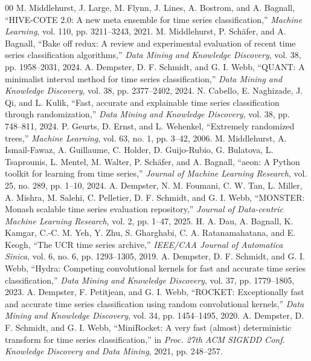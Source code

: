 \documentclass[conference]{IEEEtran}
\begin{document}
\clearpage
\begin{thebibliography}{00}
 M. Middlehurst, J. Large, M. Flynn, J. Lines, A. Bostrom, and A. Bagnall, ``HIVE-COTE 2.0: A new meta ensemble for time series classification,'' \textit{Machine Learning}, vol. 110, pp. 3211--3243, 2021.
 M. Middlehurst, P. Sch\"afer, and A. Bagnall, ``Bake off redux: A review and experimental evaluation of recent time series classification algorithms,'' \textit{Data Mining and Knowledge Discovery}, vol. 38, pp. 1958--2031, 2024.
 A. Dempster, D. F. Schmidt, and G. I. Webb, ``QUANT: A minimalist interval method for time series classification,'' \textit{Data Mining and Knowledge Discovery}, vol. 38, pp. 2377--2402, 2024.
 N. Cabello, E. Naghizade, J. Qi, and L. Kulik, ``Fast, accurate and explainable time series classification through randomization,'' \textit{Data Mining and Knowledge Discovery}, vol. 38, pp. 748--811, 2024.
 P. Geurts, D. Ernst, and L. Wehenkel, ``Extremely randomized trees,'' \textit{Machine Learning}, vol. 63, no. 1, pp. 3--42, 2006.
 M. Middlehurst, A. Ismail-Fawaz, A. Guillaume, C. Holder, D. Guijo-Rubio, G. Bulatova, L. Tsaprounis, L. Mentel, M. Walter, P. Sch\"afer, and A. Bagnall, ``aeon: A Python toolkit for learning from time series,'' \textit{Journal of Machine Learning Research}, vol. 25, no. 289, pp. 1--10, 2024.
 A. Dempster, N. M. Foumani, C. W. Tan, L. Miller, A. Mishra, M. Salehi, C. Pelletier, D. F. Schmidt, and G. I. Webb, ``MONSTER: Monash scalable time series evaluation repository,'' \textit{Journal of Data-centric Machine Learning Research}, vol. 2, pp. 1--47, 2025.
 H. A. Dau, A. Bagnall, K. Kamgar, C.-C. M. Yeh, Y. Zhu, S. Gharghabi, C. A. Ratanamahatana, and E. Keogh, ``The UCR time series archive,'' \textit{IEEE/CAA Journal of Automatica Sinica}, vol. 6, no. 6, pp. 1293--1305, 2019.
 A. Dempster, D. F. Schmidt, and G. I. Webb, ``Hydra: Competing convolutional kernels for fast and accurate time series classification,'' \textit{Data Mining and Knowledge Discovery}, vol. 37, pp. 1779--1805, 2023.
 A. Dempster, F. Petitjean, and G. I. Webb, ``ROCKET: Exceptionally fast and accurate time series classification using random convolutional kernels,'' \textit{Data Mining and Knowledge Discovery}, vol. 34, pp. 1454--1495, 2020.
 A. Dempster, D. F. Schmidt, and G. I. Webb, ``MiniRocket: A very fast (almost) deterministic transform for time series classification,'' in \textit{Proc. 27th ACM SIGKDD Conf. Knowledge Discovery and Data Mining}, 2021, pp. 248--257.

\end{thebibliography}
\end{document}
